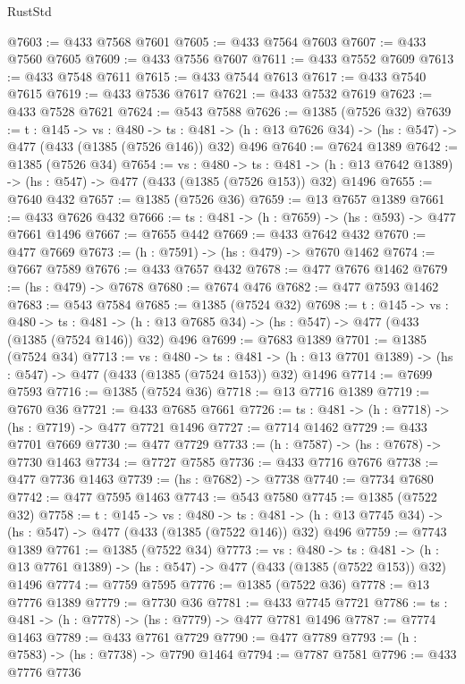 \begin{lexlean}{RustStd}
\begin{coremodule}
@7603 := @433 @7568 @7601
@7605 := @433 @7564 @7603
@7607 := @433 @7560 @7605
@7609 := @433 @7556 @7607
@7611 := @433 @7552 @7609
@7613 := @433 @7548 @7611
@7615 := @433 @7544 @7613
@7617 := @433 @7540 @7615
@7619 := @433 @7536 @7617
@7621 := @433 @7532 @7619
@7623 := @433 @7528 @7621
@7624 := @543 @7588
@7626 := @1385 (@7526 @32)
@7639 := {t : @145} ->
  {vs : @480} ->
  {ts : @481} -> (h : @13 @7626 @34) -> (hs : @547) -> @477 (@433 (@1385 (@7526 @146)) @32) @496
@7640 := @7624 @1389
@7642 := @1385 (@7526 @34)
@7654 := {vs : @480} ->
  {ts : @481} -> (h : @13 @7642 @1389) -> (hs : @547) -> @477 (@433 (@1385 (@7526 @153)) @32) @1496
@7655 := @7640 @432
@7657 := @1385 (@7526 @36)
@7659 := @13 @7657 @1389
@7661 := @433 @7626 @432
@7666 := {ts : @481} -> (h : @7659) -> (hs : @593) -> @477 @7661 @1496
@7667 := @7655 @442
@7669 := @433 @7642 @432
@7670 := @477 @7669
@7673 := (h : @7591) -> (hs : @479) -> @7670 @1462
@7674 := @7667 @7589
@7676 := @433 @7657 @432
@7678 := @477 @7676 @1462
@7679 := (hs : @479) -> @7678
@7680 := @7674 @476
@7682 := @477 @7593 @1462
@7683 := @543 @7584
@7685 := @1385 (@7524 @32)
@7698 := {t : @145} ->
  {vs : @480} ->
  {ts : @481} -> (h : @13 @7685 @34) -> (hs : @547) -> @477 (@433 (@1385 (@7524 @146)) @32) @496
@7699 := @7683 @1389
@7701 := @1385 (@7524 @34)
@7713 := {vs : @480} ->
  {ts : @481} -> (h : @13 @7701 @1389) -> (hs : @547) -> @477 (@433 (@1385 (@7524 @153)) @32) @1496
@7714 := @7699 @7593
@7716 := @1385 (@7524 @36)
@7718 := @13 @7716 @1389
@7719 := @7670 @36
@7721 := @433 @7685 @7661
@7726 := {ts : @481} -> (h : @7718) -> (hs : @7719) -> @477 @7721 @1496
@7727 := @7714 @1462
@7729 := @433 @7701 @7669
@7730 := @477 @7729
@7733 := (h : @7587) -> (hs : @7678) -> @7730 @1463
@7734 := @7727 @7585
@7736 := @433 @7716 @7676
@7738 := @477 @7736 @1463
@7739 := (hs : @7682) -> @7738
@7740 := @7734 @7680
@7742 := @477 @7595 @1463
@7743 := @543 @7580
@7745 := @1385 (@7522 @32)
@7758 := {t : @145} ->
  {vs : @480} ->
  {ts : @481} -> (h : @13 @7745 @34) -> (hs : @547) -> @477 (@433 (@1385 (@7522 @146)) @32) @496
@7759 := @7743 @1389
@7761 := @1385 (@7522 @34)
@7773 := {vs : @480} ->
  {ts : @481} -> (h : @13 @7761 @1389) -> (hs : @547) -> @477 (@433 (@1385 (@7522 @153)) @32) @1496
@7774 := @7759 @7595
@7776 := @1385 (@7522 @36)
@7778 := @13 @7776 @1389
@7779 := @7730 @36
@7781 := @433 @7745 @7721
@7786 := {ts : @481} -> (h : @7778) -> (hs : @7779) -> @477 @7781 @1496
@7787 := @7774 @1463
@7789 := @433 @7761 @7729
@7790 := @477 @7789
@7793 := (h : @7583) -> (hs : @7738) -> @7790 @1464
@7794 := @7787 @7581
@7796 := @433 @7776 @7736

\end{coremodule}
\end{lexlean}
